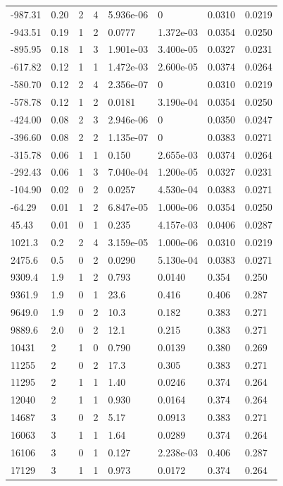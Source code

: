 \documentclass[preview]{standalone}
\begin{document}
{{\begin{tabular}{L{1.2cm}C{1.2cm} C{0.3cm}C{0.5cm} C{1.4cm}C{1.4cm} C{1.4cm}C{1.4cm}}
  -987.31  &  0.20  & 2     &  4 &  5.936e-06  & 0  & 0.0310 &  0.0219   \\ 
  -943.51  &  0.19  & 1     &  2 &  0.0777  & 1.372e-03  & 0.0354 &  0.0250   \\ 
  -895.95  &  0.18  & 1     &  3 &  1.901e-03  & 3.400e-05  & 0.0327 &  0.0231   \\ 
  -617.82  &  0.12  & 1     &  1 &  1.472e-03  & 2.600e-05  & 0.0374 &  0.0264   \\ 
  -580.70  &  0.12  & 2     &  4 &  2.356e-07  & 0  & 0.0310 &  0.0219   \\ 
  -578.78  &  0.12  & 1     &  2 &  0.0181  & 3.190e-04  & 0.0354 &  0.0250   \\ 
  -424.00  &  0.08  & 2     &  3 &  2.946e-06  & 0  & 0.0350 &  0.0247   \\ 
  -396.60  &  0.08  & 2     &  2 &  1.135e-07  & 0  & 0.0383 &  0.0271   \\ 
  -315.78  &  0.06  & 1     &  1 &  0.150  & 2.655e-03  & 0.0374 &  0.0264   \\ 
  -292.43  &  0.06  & 1     &  3 &  7.040e-04  & 1.200e-05  & 0.0327 &  0.0231   \\ 
  -104.90  &  0.02  & 0     &  2 &  0.0257  & 4.530e-04  & 0.0383 &  0.0271   \\ 
  -64.29  &  0.01  & 1     &  2 &  6.847e-05  & 1.000e-06  & 0.0354 &  0.0250   \\ 
  45.43  &  0.01  & 0     &  1 &  0.235  & 4.157e-03  & 0.0406 &  0.0287   \\ 
  1021.3  &   0.2  & 2     &  4 &  3.159e-05  & 1.000e-06  & 0.0310 &  0.0219   \\ 
  2475.6  &   0.5  & 0     &  2 &  0.0290  & 5.130e-04  & 0.0383 &  0.0271   \\ 
  9309.4  &   1.9  & 1     &  2 &  0.793  & 0.0140  & 0.354 &  0.250   \\ 
  9361.9  &   1.9  & 0     &  1 &  23.6  & 0.416  & 0.406 &  0.287   \\ 
  9649.0  &   1.9  & 0     &  2 &  10.3  & 0.182  & 0.383 &  0.271   \\ 
  9889.6  &   2.0  & 0     &  2 &  12.1  & 0.215  & 0.383 &  0.271   \\ 
  10431  &     2  & 1     &  0 &  0.790  & 0.0139  & 0.380 &  0.269   \\ 
  11255  &     2  & 0     &  2 &  17.3  & 0.305  & 0.383 &  0.271   \\ 
  11295  &     2  & 1     &  1 &  1.40  & 0.0246  & 0.374 &  0.264   \\ 
  12040  &     2  & 1     &  1 &  0.930  & 0.0164  & 0.374 &  0.264   \\ 
  14687  &     3  & 0     &  2 &  5.17  & 0.0913  & 0.383 &  0.271   \\ 
  16063  &     3  & 1     &  1 &  1.64  & 0.0289  & 0.374 &  0.264   \\ 
  16106  &     3  & 0     &  1 &  0.127  & 2.238e-03  & 0.406 &  0.287   \\ 
  17129  &     3  & 1     &  1 &  0.973  & 0.0172  & 0.374 &  0.264   \\ 
\hline 
\end{tabular} 

}}
\end{document}
